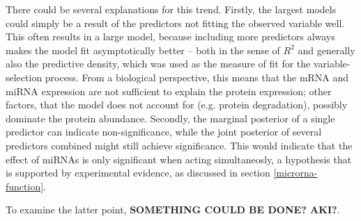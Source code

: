 There could be several explanations for this trend. Firstly, the largest
models could simply be a result of the predictors not fitting the observed
variable well. This often results in a large model, because including more
predictors always makes the model fit asymptotically better -- both in the
sense of $R^2$ and generally also the predictive density, which was used as
the measure of fit for the variable-selection process. From a biological
perspective, this means that the mRNA and miRNA expression are not sufficient
to explain the protein expression; other factors, that the model does not
account for (e.g. protein degradation), possibly dominate the protein
abundance. Secondly, the marginal posterior of a single predictor can indicate
non-significance, while the joint posterior of several predictors combined
might still achieve significance. This would indicate that the effect of
miRNAs is only significant when acting simultaneosly, a hypothesis that is
supported by experimental evidence, as discussed in section
\ref{microrna-function}.

To examine the latter point, \textbf{SOMETHING COULD BE DONE? AKI?}.
